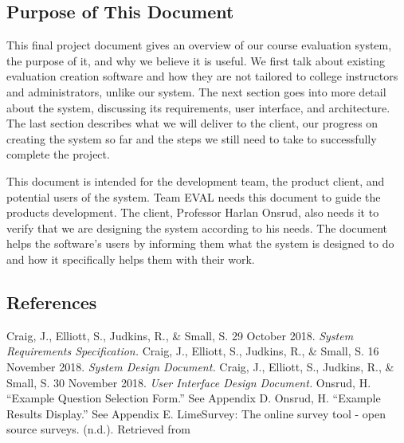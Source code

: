 \documentclass{article}
\begin{document}
\subsection{Purpose of This Document}

This final project document gives an overview of our course evaluation system, the purpose of it, and why we believe it is useful. We first talk about existing evaluation creation software and how they are not tailored to college instructors and administrators, unlike our system. The next section goes into more detail about the system, discussing its requirements, user interface, and architecture. The last section describes what we will deliver to the client, our progress on creating the system so far and the steps we still need to take to successfully complete the project.

This document is intended for the development team, the product client, and potential users of the system. Team EVAL needs this document to guide the products development. The client, Professor Harlan Onsrud, also needs it to verify that we are designing the system according to his needs. The document helps the software's users by informing them what the system is designed to do and how it specifically helps them with their work.

\subsection{References}

Craig, J., Elliott, S., Judkins, R., \& Small, S. 29 October 2018. \textit{System Requirements Specification.}
\vspace{3mm}\newline
Craig, J., Elliott, S., Judkins, R., \& Small, S. 16 November 2018. \textit{System Design Document.}
\vspace{3mm}\newline
Craig, J., Elliott, S., Judkins, R., \& Small, S. 30 November 2018. \textit{User Interface Design Document.}
\vspace{3mm}\newline
Onsrud, H. ``Example Question Selection Form.'' See Appendix D.
\vspace{3mm}\newline
Onsrud, H. ``Example Results Display.'' See Appendix E.
\vspace{3mm}\newline
LimeSurvey: The online survey tool - open source surveys. (n.d.). Retrieved from
\end{document}
